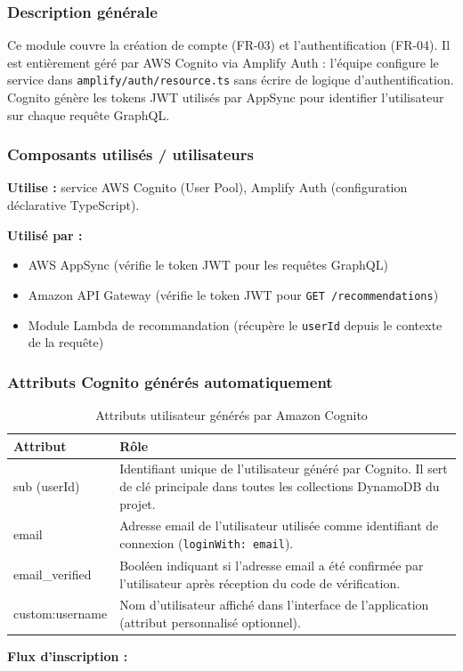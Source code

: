 \documentclass[a4paper,12pt]{report}
\begin{document}
\subsubsection{Description générale}

Ce module couvre la création de compte (FR-03) et l'authentification (FR-04). Il est entièrement géré par AWS Cognito via Amplify Auth : l'équipe configure le service dans \texttt{amplify/auth/resource.ts} sans écrire de logique d'authentification. Cognito génère les tokens JWT utilisés par AppSync pour identifier l'utilisateur sur chaque requête GraphQL.

\subsubsection{Composants utilisés / utilisateurs}

\textbf{Utilise :} service AWS Cognito (User Pool), Amplify Auth (configuration déclarative TypeScript).

\textbf{Utilisé par :}
\begin{itemize}
\item AWS AppSync (vérifie le token JWT pour les requêtes GraphQL)
\item Amazon API Gateway (vérifie le token JWT pour \texttt{GET /recommendations})
\item Module Lambda de recommandation (récupère le \texttt{userId} depuis le contexte de la requête)
\end{itemize}

\subsubsection{Attributs Cognito générés automatiquement}

\begin{table}[htbp]
\centering
\begin{tabular}{lp{10cm}}
\toprule
\textbf{Attribut} & \textbf{Rôle} \\
\midrule

sub (userId) & Identifiant unique de l'utilisateur généré par Cognito. Il sert de clé principale dans toutes les collections DynamoDB du projet. \\

email & Adresse email de l'utilisateur utilisée comme identifiant de connexion (\texttt{loginWith: email}). \\

email\_verified & Booléen indiquant si l'adresse email a été confirmée par l'utilisateur après réception du code de vérification. \\

custom:username & Nom d'utilisateur affiché dans l'interface de l'application (attribut personnalisé optionnel). \\

\bottomrule
\end{tabular}
\caption{Attributs utilisateur générés par Amazon Cognito}
\end{table}
\newpage
\textbf{Flux d'inscription :}
\end{document}
